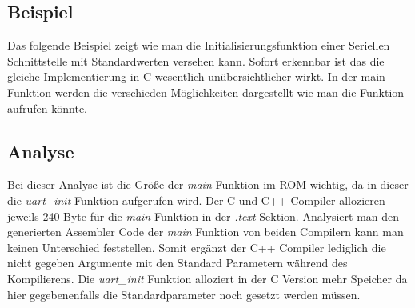 \documentclass[MES,Master,ngerman]{twbook}%
\begin{document}
\subsection{Beispiel}          
Das folgende Beispiel zeigt wie man die Initialisierungsfunktion einer Seriellen Schnittstelle mit Standardwerten versehen kann. Sofort erkennbar ist das die gleiche Implementierung in C wesentlich unübersichtlicher wirkt. In der main Funktion werden die verschieden Möglichkeiten dargestellt wie man die Funktion aufrufen könnte.
\begin{figure}[!htb]
	\begin{subfigure}[b]{0.5\textwidth}
		
		\label{fig:3}
	\end{subfigure}
	\begin{subfigure}[b]{0.5\textwidth}
		
		\label{fig:4}
	\end{subfigure}
\end{figure}

\subsection{Analyse}
Bei dieser Analyse ist die Größe der \textit{main} Funktion im ROM wichtig, da in dieser die \textit{uart\_init} Funktion aufgerufen wird. Der C und C++ Compiler allozieren jeweils 240 Byte für die \textit{main} Funktion in der \textit{.text} Sektion. Analysiert man den generierten Assembler Code der \textit{main} Funktion von beiden Compilern kann man keinen Unterschied feststellen. Somit ergänzt der C++ Compiler lediglich die nicht gegeben Argumente mit den Standard Parametern während des Kompilierens. Die \textit{uart\_init} Funktion alloziert in der C Version mehr Speicher da hier gegebenenfalls die Standardparameter noch gesetzt werden müssen.
\end{document}
